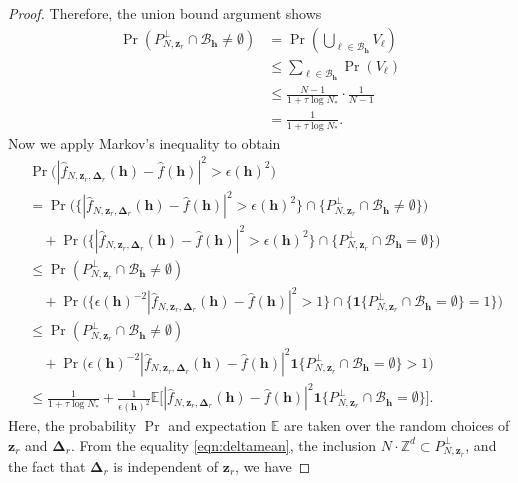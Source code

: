\documentclass[pdflatex,sn-basic,Numbered]{sn-jnl}%
\newcommand{\bsh}{\boldsymbol{h}}
\newcommand{\bsl}{\boldsymbol{\ell}}
\newcommand{\bsz}{\boldsymbol{z}}
\newcommand{\bsDelta}{\boldsymbol{\Delta}}
\newcommand{\ZZ}{\mathbb{Z}}
\newcommand{\e}{\mathbb{E}}
\newcommand{\bsone}{\boldsymbol{1}}
\theoremstyle{thmstyleone}%
\theoremstyle{thmstyletwo}%
\begin{document}
\begin{proof}
Therefore, the union bound argument shows
\begin{align}\label{eqn:dualspace}
\Pr(P_{N,\boldsymbol{z}_r}^\perp\cap \mathcal{B}_{\bsh} \neq \emptyset)
&= 
\Pr\left(\bigcup_{\bsl\in\mathcal{B}_{\bsh}} V_{\bsl} \right)\nonumber\\
&\le \sum_{\bsl\in\mathcal{B}_{\bsh}} \Pr (V_{\bsl}) \nonumber\\
&\le \frac{N-1}{1+\tau\log N_*}\cdot \frac{1}{N-1}\nonumber\\
&= \frac{1}{1+\tau\log N_*}.
\end{align}
Now we apply Markov's inequality to obtain
\begin{align}\label{eqn:Markov}
    & \Pr\Big(|\widehat{f}_{N,\bsz_r,\bsDelta_r}(\bsh)-\widehat{f}(\bsh)|^2>\epsilon(\bsh)^2\Big)\nonumber\\
    & = \Pr\Big(\{|\widehat{f}_{N,\bsz_r,\bsDelta_r}(\bsh)-\widehat{f}(\bsh)|^2> \epsilon(\bsh)^2\}\cap \{P_{N,\boldsymbol{z}_r}^\perp\cap \mathcal{B}_{\bsh}\neq \emptyset\}\Big) \nonumber\\
    & \quad +\Pr\Big(\{|\widehat{f}_{N,\bsz_r,\bsDelta_r}(\bsh)-\widehat{f}(\bsh)|^2> \epsilon(\bsh)^2\}\cap \{P_{N,\boldsymbol{z}_r}^\perp\cap \mathcal{B}_{\bsh}= \emptyset\}\Big) \nonumber\\
    & \leq \Pr(P_{N,\boldsymbol{z}_r}^\perp\cap \mathcal{B}_{\bsh}\neq \emptyset) \nonumber\\
    & \quad +\Pr\Big(\{\epsilon(\bsh)^{-2}|\widehat{f}_{N,\bsz_r,\bsDelta_r}(\bsh)-\widehat{f}(\bsh)|^2>1\}\cap \{\bsone\{P_{N,\boldsymbol{z}_r}^\perp\cap \mathcal{B}_{\bsh}= \emptyset\}= 1\}\Big) \nonumber\\
    & \leq \Pr(P_{N,\boldsymbol{z}_r}^\perp\cap \mathcal{B}_{\bsh}\neq \emptyset)\nonumber\\
    & \quad +\Pr\Big(\epsilon(\bsh)^{-2}|\widehat{f}_{N,\bsz_r,\bsDelta_r}(\bsh)-\widehat{f}(\bsh)|^2\bsone\{P_{N,\boldsymbol{z}_r}^\perp\cap \mathcal{B}_{\bsh}= \emptyset\}> 1\Big) \nonumber\\
    & \leq \frac{1}{1+ \tau\log N_*} 
    +\frac{1}{\epsilon(\bsh)^2}\e\Big[|\widehat{f}_{N,\bsz_r,\bsDelta_r}(\bsh)-\widehat{f}(\bsh)|^2\bsone\{P_{N,\boldsymbol{z}_r}^\perp\cap \mathcal{B}_{\bsh}= \emptyset\}\Big].
\end{align}
Here, the probability $\Pr$ and expectation $\e$ are taken over the random choices of $\bsz_r$ and $\bsDelta_r$.
From the equality \eqref{eqn:deltamean}, the inclusion $N\cdot \ZZ^d \subset P_{N,\boldsymbol{z}_r}^\perp$, and the fact that $\bsDelta_r$ is independent of $\bsz_r$, we have

\end{proof}
\end{document}
